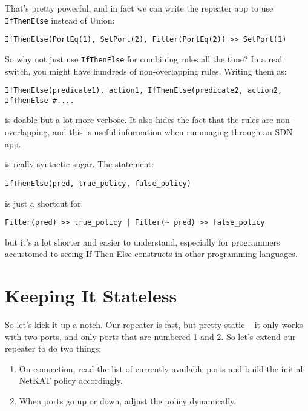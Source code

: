 That's pretty powerful, and in fact we can write the repeater app to use \texttt{IfThenElse} instead of Union:

\begin{verbatim}
IfThenElse(PortEq(1), SetPort(2), Filter(PortEq(2)) >> SetPort(1) 
\end{verbatim}

So why not just use \texttt{IfThenElse} for combining rules all the time?  In a real switch, you might have 
hundreds of non-overlapping rules.  Writing them as:

\begin{verbatim}
IfThenElse(predicate1), action1, IfThenElse(predicate2, action2, IfThenElse #....
\end{verbatim}

is doable but a lot more verbose.  It also hides the fact that the rules are non-overlapping, and this is useful
information when rummaging through an SDN app. 

 is really syntactic sugar.  The statement:

\begin{verbatim}
IfThenElse(pred, true_policy, false_policy)
\end{verbatim}

is just a shortcut for:

\begin{verbatim}
Filter(pred) >> true_policy | Filter(~ pred) >> false_policy
\end{verbatim}

but it's a lot shorter and easier to understand, especially for programmers accustomed to seeing If-Then-Else
constructs in other programming languages.

\section{Keeping It Stateless}
\label{section:stateless}

So let's kick it up a notch.  
Our repeater is fast, but pretty static -- it only works with two ports, and only ports that are numbered
1 and 2.
So let's extend our repeater to do two things: 

\begin{enumerate}
\item On connection, read the list of currently available ports and build the initial NetKAT policy accordingly.
\item When ports go up or down, adjust the policy dynamically.
\end{enumerate}

